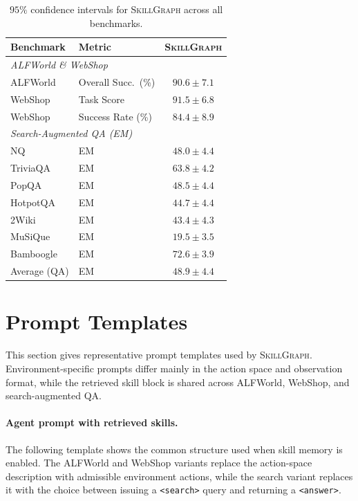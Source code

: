 \begin{table}[h]
    \caption{$95\%$ confidence intervals for \textsc{SkillGraph} across all benchmarks.}
    \label{tab:ci}
    \centering
    \small
    \begin{tabular}{llc}
    \toprule
    Benchmark & Metric & \textsc{SkillGraph} \\
    \midrule
    \multicolumn{3}{l}{\textit{ALFWorld \& WebShop}} \\
    ALFWorld & Overall Succ.\ (\%) & $90.6 \pm 7.1$ \\
    WebShop & Task Score & $91.5 \pm 6.8$ \\
    WebShop & Success Rate (\%) & $84.4 \pm 8.9$ \\
    \midrule
    \multicolumn{3}{l}{\textit{Search-Augmented QA (EM)}} \\
    NQ & EM & $48.0 \pm 4.4$ \\
    TriviaQA & EM & $63.8 \pm 4.2$ \\
    PopQA & EM & $48.5 \pm 4.4$ \\
    HotpotQA & EM & $44.7 \pm 4.4$ \\
    2Wiki & EM & $43.4 \pm 4.3$ \\
    MuSiQue & EM & $19.5 \pm 3.5$ \\
    Bamboogle & EM & $72.6 \pm 3.9$ \\
    \midrule
    Average (QA) & EM & $48.9 \pm 4.4$ \\
    \bottomrule
    \end{tabular}
\end{table}

\section{Prompt Templates}
\label{app:prompts}

This section gives representative prompt templates used by \textsc{SkillGraph}. Environment-specific prompts differ mainly in the action space and observation format, while the retrieved skill block is shared across ALFWorld, WebShop, and search-augmented QA.

\paragraph{Agent prompt with retrieved skills.}
The following template shows the common structure used when skill memory is enabled. The ALFWorld and WebShop variants replace the action-space description with admissible environment actions, while the search variant replaces it with the choice between issuing a \texttt{<search>} query and returning a \texttt{<answer>}.

